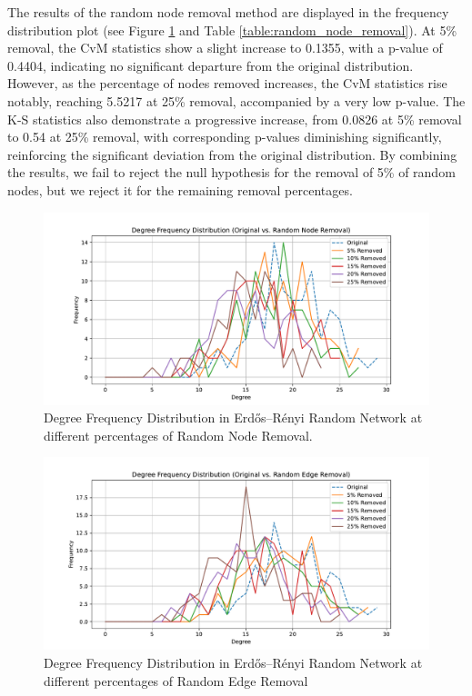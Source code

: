 \documentclass[conference]{IEEEtran} %
\begin{document}
The results of the random node removal method are displayed in the frequency distribution plot (see Figure \ref{fig:13.3} and Table \ref{table:random_node_removal}). At 5\% removal, the CvM statistics show a slight increase to 0.1355, with a p-value of 0.4404, indicating no significant departure from the original distribution. However, as the percentage of nodes removed increases, the CvM statistics rise notably, reaching 5.5217 at 25\% removal, accompanied by a very low p-value. The K-S statistics also demonstrate a progressive increase, from 0.0826 at 5\% removal to 0.54 at 25\% removal, with corresponding p-values diminishing significantly, reinforcing the significant deviation from the original distribution. By combining the results, we fail to reject the null hypothesis for the removal of 5\% of random nodes, but we reject it for the remaining removal percentages. 

\begin{figure}[t]
  \centering
  \includegraphics[width = 1.1\linewidth]{random_network_frequency_distribution_plot_Random Node Removal.pdf}
  \caption{Degree Frequency Distribution in Erdős–Rényi Random Network at different percentages of Random Node Removal.}
  \label{fig:13.3}
\end{figure}


\begin{figure}[t]
  \centering
  \includegraphics[width=1.1\linewidth]{random_network_frequency_distribution_plot_Random Edge Removal.pdf}
  \caption{Degree Frequency Distribution in Erdős–Rényi Random Network at different percentages of Random Edge Removal}
  \label{fig:13.4}
\end{figure}
\end{document}
